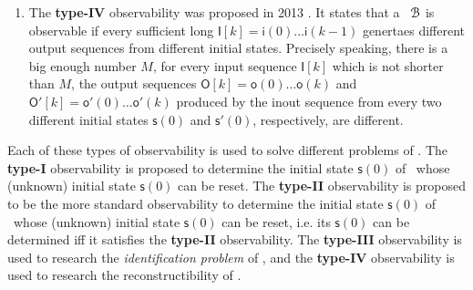 \begin{enumerate}
\item  The  {\bf type-IV}  observability was  proposed in 2013 \cite{Fornasini2013Observability}. It states that a \BCN\ ${\mathcal{B}}$ is observable if every sufficient long $\mathsf{I}[k]=\mathsf{i}(0)\ldots\mathsf{i}(k-1)$ genertaes different output sequences  from different initial states. Precisely speaking, there is a big enough number $M$, for every  input sequence $\mathsf{I}[k]$ which is not shorter than $M$, the output sequences $\mathsf{O}[k]=\mathsf{o}(0) \ldots\mathsf{o}(k)$ and  $\mathsf{O}'[k]=\mathsf{o}'(0)\ldots\mathsf{o}'(k)$ produced by the inout sequence from every two different initial states $\mathsf{s}(0)$ and $\mathsf{s}'(0)$, respectively, are different.
\end{enumerate}

Each of these types of observability is used to solve different problems of \BCNs. The {\bf type-I}  observability is proposed to determine the initial state $\mathsf{s}(0)$ of \BCN\ whose (unknown) initial state $\mathsf{s}(0)$ can be reset. %
The {\bf type-II}  observability is proposed to be the more standard observability to determine the initial state $\mathsf{s}(0)$ of \BCN\ whose  (unknown) initial state $\mathsf{s}(0)$ can be reset, i.e. its $\mathsf{s}(0)$ can be determined iff it satisfies the  {\bf type-II}  observability. The {\bf type-III} observability is used to research the {\em identification problem} of \BCN, and the {\bf type-IV} observability is used to research the reconstructibility of \BCN. %

